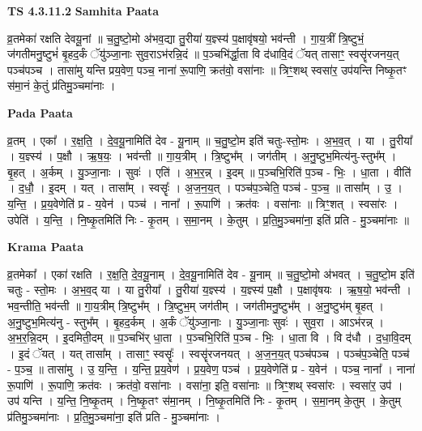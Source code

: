 \documentclass[17pt]{extarticle}
\begin{document}
\textbf{TS 4.3.11.2 } \newline
\textbf{Samhita Paata} \newline

व्र॒तमेका॑ रक्षति देवयू॒नां ॥ च॒तु॒ष्टो॒मो अ॑भव॒द्या तु॒रीया॑ य॒ज्ञ्स्य॑ प॒क्षावृ॑षयो॒ भव॑न्ती । गा॒य॒त्रीं त्रि॒ष्टुभं॒ ज॑गतीमनु॒ष्टुभं॑ बृ॒हद॒र्कं ॅयु॑ञ्जा॒नाः सुव॒राऽभ॑रन्नि॒दं ॥ प॒ञ्चभि॑र्द्धा॒ता वि द॑धावि॒दं ॅयत् तासाꣳ॒॒ स्वसॄ॑रजनय॒त् पञ्च॑पञ्च । तासा॑मु यन्ति प्रय॒वेण॒ पञ्च॒ नाना॑ रू॒पाणि॒ क्रत॑वो॒ वसा॑नाः ॥ त्रिꣳ॒॒शथ् स्वसा॑र॒ उप॑यन्ति निष्कृ॒तꣳ स॑मा॒नं के॒तुं प्र॑तिमु॒ञ्चमा॑नाः । \newline

\textbf{Pada Paata} \newline

व्र॒तम् । एका᳚ । र॒क्ष॒ति॒ । दे॒व॒यू॒नामिति॑ देव - यू॒नाम् ॥ च॒तु॒ष्टो॒म इति॑ चतुः-स्तो॒मः । अ॒भ॒व॒त् । या । तु॒रीया᳚ । य॒ज्ञ्स्य॑ । प॒क्षौ । ऋ॒ष॒यः॒ । भव॑न्ती ॥ गा॒य॒त्रीम् । त्रि॒ष्टुभ᳚म् । जग॑तीम् । अ॒नु॒ष्टुभ॒मित्य॑नु-स्तुभ᳚म् । बृ॒हत् । अ॒र्कम् । यु॒ञ्जा॒नाः । सुवः॑ । एति॑ । अ॒भ॒र॒न्न् । इ॒दम् ॥ प॒ञ्चभि॒रिति॑ प॒ञ्च - भिः॒ । धा॒ता । वीति॑ । द॒धौ॒ । इ॒दम् । यत् । तासा᳚म् । स्वसॄः᳚ । अ॒ज॒न॒य॒त् । पञ्च॑प॒ञ्चेति॒ पञ्च॑ - प॒ञ्च॒ ॥ तासा᳚म् । उ॒ । य॒न्ति॒ । प्र॒य॒वेणेति॑ प्र - य॒वेन॑ । पञ्च॑ । नाना᳚ । रू॒पाणि॑ । क्रत॑वः । वसा॑नाः ॥ त्रिꣳ॒॒शत् । स्वसा॑रः । उपेति॑ । य॒न्ति॒ । नि॒ष्कृ॒तमिति॑ निः - कृ॒तम् । स॒मा॒नम् । के॒तुम् । प्र॒ति॒मु॒ञ्चमा॑ना॒ इति॑ प्रति - मु॒ञ्चमा॑नाः ॥  \newline


\textbf{Krama Paata} \newline

व्र॒तमेका᳚ । एका॑ रक्षति । र॒क्ष॒ति॒ दे॒व॒यू॒नाम् । दे॒व॒यू॒नामिति॑ देव - यू॒नाम् ॥ च॒तु॒ष्टो॒मो अ॑भवत् । च॒तु॒ष्टो॒म इति॑ चतुः - स्तो॒मः । अ॒भ॒व॒द् या । या तु॒रीया᳚ । तु॒रीया॑ य॒ज्ञ्स्य॑ । य॒ज्ञ्स्य॑ प॒क्षौ । प॒क्षावृ॑षयः । ऋ॒ष॒यो॒ भव॑न्ती । भव॒न्तीति॒ भव॑न्ती ॥ गा॒य॒त्रीम् त्रि॒ष्टुभ᳚म् । त्रि॒ष्टुभ॒म् जग॑तीम् । जग॑तीमनु॒ष्टुभ᳚म् । अ॒नु॒ष्टुभ॑म् बृ॒हत् । अ॒नु॒ष्टुभ॒मित्य॑नु - स्तुभ᳚म् । बृ॒हद॒र्कम् । अ॒र्कं ॅयु॑ञ्जा॒नाः । यु॒ञ्जा॒नाः सुवः॑ । सुव॒रा । आऽभ॑रन्न् । अ॒भ॒र॒न्नि॒दम् । इ॒दमिती॒दम् ॥ प॒ञ्चभि॑र् धा॒ता । प॒ञ्चभि॒रिति॑ प॒ञ्च - भिः॒ । धा॒ता वि । वि द॑धौ । द॒धा॒वि॒दम् । इ॒दं ॅयत् । यत् तासा᳚म् । तासाꣳ॒॒ स्वसॄः᳚ । स्वसॄ॑रजनयत् । अ॒ज॒न॒य॒त् पञ्च॑पञ्च । पञ्च॑प॒ञ्चेति॒ पञ्च॑ - प॒ञ्च॒ ॥ तासा॑मु । उ॒ य॒न्ति॒ । य॒न्ति॒ प्र॒य॒वेण॑ । प्र॒य॒वेण॒ पञ्च॑ । प्र॒य॒वेणेति॑ प्र - य॒वेन॑ । पञ्च॒ नाना᳚ । नाना॑ रू॒पाणि॑ । रू॒पाणि॒ क्रत॑वः । क्रत॑वो॒ वसा॑नाः । वसा॑ना॒ इति॒ वसा॑नाः ॥ त्रिꣳ॒॒शथ् स्वसा॑रः । स्वसा॑र॒ उप॑ । उप॑ यन्ति । य॒न्ति॒ नि॒ष्कृ॒तम् । नि॒ष्कृ॒तꣳ स॑मा॒नम् । नि॒ष्कृ॒तमिति॑ निः - कृ॒तम् । स॒मा॒नम् के॒तुम् । के॒तुम् प्र॑तिमु॒ञ्चमा॑नाः । प्र॒ति॒मु॒ञ्चमा॑ना॒ इति॑ प्रति - मु॒ञ्चमा॑नाः । \newline
\end{document}
